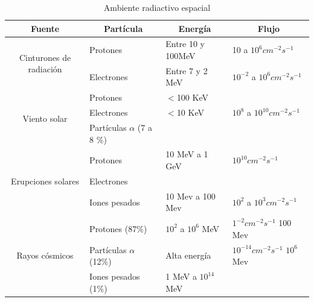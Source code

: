 \documentclass[a4paper,openright,12pt]{report}
\begin{document}
\begin{table}[H]
\centering
\caption{Ambiente radiactivo espacial}
\label{Ambiente}
\begin{tabular}{|c|l|l|l|}
\hline
Fuente                                   & \multicolumn{1}{c|}{Partícula} & \multicolumn{1}{c|}{Energía} & \multicolumn{1}{c|}{Flujo}           \\ \hline
\multirow{2}{*}{Cinturones de radiación} & Protones                       & Entre 10 y 100MeV            & 10 a $10^{6}cm^{-2}s^{-1}$           \\ \cline{2-4} 
                                         & Electrones                     & Entre 7 y 2 MeV              & $10^{-2}$ a $10^{6}cm^{-2}s^{-1}$    \\ \hline
\multirow{3}{*}{Viento solar}            & Protones                       & $<$100 KeV                   &                                      \\ \cline{2-4} 
                                         & Electrones                     & $<$10 KeV                    & $10^{8}$ a $10^{10}cm^{-2}s^{-1}$    \\ \cline{2-4} 
                                         & Partículas $\alpha$ (7 a 8 \%) &                              &                                      \\ \hline
\multirow{3}{*}{Erupciones solares}      & Protones                       & 10 MeV a 1 GeV               & $10^{10}cm^{-2}s^{-1}$               \\ \cline{2-4} 
                                         & Electrones                     &                              &                                      \\ \cline{2-4} 
                                         & Iones pesados                  & 10 Mev a  100 Mev            & $10^{2}$ a $10^{3} cm^{-2}s^{-1}$    \\ \hline
\multirow{3}{*}{Rayos cósmicos}          & Protones (87\%)                & $10^{2}$ a $10^{6}$ MeV      & $1^{-2}cm^{-2}s^{-1}$ 100 Mev        \\ \cline{2-4} 
                                         & Partículas $\alpha$ (12\%)     & Alta energía                 & $10^{-14}cm^{-2}s^{-1}$ $10^{6}$ Mev \\ \cline{2-4} 
                                         & Iones pesados (1\%)            & 1 MeV a $10^{14}$ MeV        &                                      \\ \hline
\end{tabular}
\end{table}
\end{document}
